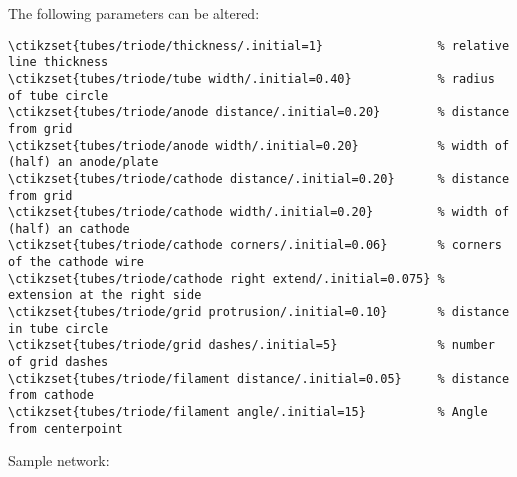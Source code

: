 \documentclass[a4paper,titlepage]{article}
\begin{document}
The following parameters can be altered:

\begin{lstlisting}[basicstyle=\small\ttfamily]
\ctikzset{tubes/triode/thickness/.initial=1}                % relative line thickness
\ctikzset{tubes/triode/tube width/.initial=0.40}            % radius of tube circle
\ctikzset{tubes/triode/anode distance/.initial=0.20}        % distance from grid
\ctikzset{tubes/triode/anode width/.initial=0.20}           % width of (half) an anode/plate
\ctikzset{tubes/triode/cathode distance/.initial=0.20}      % distance from grid
\ctikzset{tubes/triode/cathode width/.initial=0.20}         % width of (half) an cathode
\ctikzset{tubes/triode/cathode corners/.initial=0.06}       % corners of the cathode wire
\ctikzset{tubes/triode/cathode right extend/.initial=0.075} % extension at the right side
\ctikzset{tubes/triode/grid protrusion/.initial=0.10}       % distance in tube circle
\ctikzset{tubes/triode/grid dashes/.initial=5}              % number of grid dashes
\ctikzset{tubes/triode/filament distance/.initial=0.05}     % distance from cathode
\ctikzset{tubes/triode/filament angle/.initial=15}          % Angle from centerpoint
\end{lstlisting}


\bigskip

Sample network:


\end{document}
